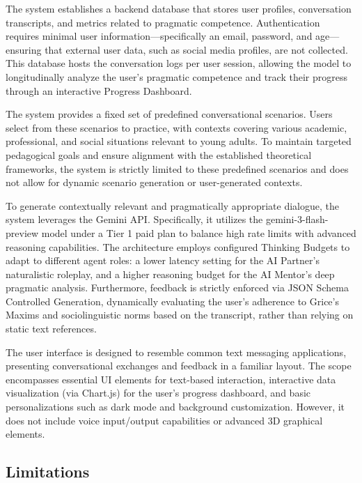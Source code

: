     The system establishes a backend database that stores user profiles, conversation transcripts, and metrics related to pragmatic competence. Authentication requires minimal user information—specifically an email, password, and age—ensuring that external user data, such as social media profiles, are not collected. This database hosts the conversation logs per user session, allowing the model to longitudinally analyze the user's pragmatic competence and track their progress through an interactive Progress Dashboard.

    The system provides a fixed set of predefined conversational scenarios. Users select from these scenarios to practice, with contexts covering various academic, professional, and social situations relevant to young adults. To maintain targeted pedagogical goals and ensure alignment with the established theoretical frameworks, the system is strictly limited to these predefined scenarios and does not allow for dynamic scenario generation or user-generated contexts.

    To generate contextually relevant and pragmatically appropriate dialogue, the system leverages the Gemini API. Specifically, it utilizes the gemini-3-flash-preview model under a Tier 1 paid plan to balance high rate limits with advanced reasoning capabilities. The architecture employs configured Thinking Budgets to adapt to different agent roles: a lower latency setting for the AI Partner's naturalistic roleplay, and a higher reasoning budget for the AI Mentor's deep pragmatic analysis. Furthermore, feedback is strictly enforced via JSON Schema Controlled Generation, dynamically evaluating the user's adherence to Grice's Maxims and sociolinguistic norms based on the transcript, rather than relying on static text references.

    The user interface is designed to resemble common text messaging applications, presenting conversational exchanges and feedback in a familiar layout. The scope encompasses essential UI elements for text-based interaction, interactive data visualization (via Chart.js) for the user's progress dashboard, and basic personalizations such as dark mode and background customization. However, it does not include voice input/output capabilities or advanced 3D graphical elements.

    \subsection*{Limitations}

